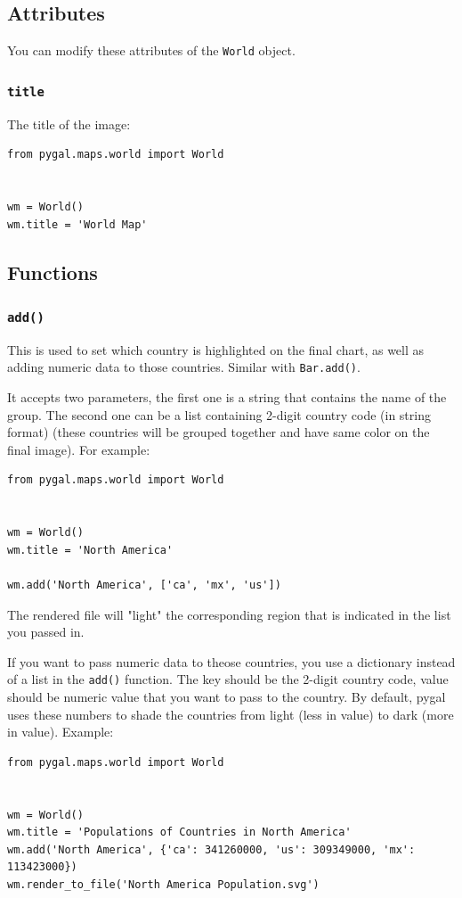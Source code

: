 \documentclass[12pt]{book}
\begin{document}
\subsection{Attributes}
\label{sec:org1062412}
You can modify these attributes of the \texttt{World} object.
\subsubsection{\texttt{title}}
\label{sec:org426c71a}
The title of the image:
\begin{verbatim}
from pygal.maps.world import World


wm = World()
wm.title = 'World Map'
\end{verbatim}

\subsection{Functions}
\label{sec:org0f525ac}
\subsubsection{\texttt{add()}}
\label{sec:org00c0490}
This is used to set which country is highlighted on the final chart, as well as adding numeric data to those countries. Similar with \texttt{Bar.add()}.

It accepts two parameters, the first one is a string that contains the name of the group. The second one can be a list containing 2-digit country code (in string format) (these countries will be grouped together and have same color on the final image). For example:
\begin{verbatim}
from pygal.maps.world import World


wm = World()
wm.title = 'North America'

wm.add('North America', ['ca', 'mx', 'us'])
\end{verbatim}
The rendered file will "light" the corresponding region that is indicated in the list you passed in.

If you want to pass numeric data to theose countries, you use a dictionary instead of a list in the \texttt{add()} function. The key should be the 2-digit country code, value should be numeric value that you want to pass to the country. By default, pygal uses these numbers to shade the countries from light (less in value) to dark (more in value). Example:
\begin{verbatim}
from pygal.maps.world import World


wm = World()
wm.title = 'Populations of Countries in North America'
wm.add('North America', {'ca': 341260000, 'us': 309349000, 'mx': 113423000})
wm.render_to_file('North America Population.svg')
\end{verbatim}
\end{document}
